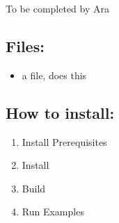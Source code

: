 To be completed by Ara

\subsection{Files:}

\begin{itemize}
\item{a file, does this}
\end{itemize}


\subsection{How to install:}
\begin{enumerate}
	\item{Install Prerequisites} 
	\item{Install } 
	\item{Build } 
	\item{Run Examples} 
\end{enumerate}

